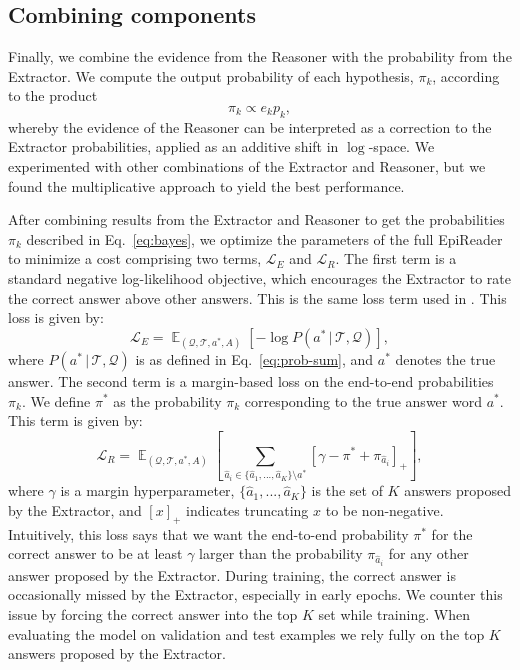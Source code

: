 \documentclass[11pt,letterpaper]{article}
\newcommand{\LL}{\mathcal{L}}
\newcommand{\QQ}{\mathcal{Q}}
\newcommand{\TT}{\mathcal{T}}
\DeclareMathOperator*{\expect}{\mathbb{E}}
\begin{document}
\subsection{Combining components}
Finally, we combine the evidence from the Reasoner with the probability from the Extractor.
We compute the output probability of each hypothesis, $\pi_k$, according to the product
\begin{equation}
	\pi_k \propto e_k p_k,
	\label{eq:bayes}
\end{equation}
whereby the evidence of the Reasoner can be interpreted as a correction to the Extractor probabilities, applied as an additive shift in $\log$-space.
We experimented with other combinations of the Extractor and Reasoner, but we found the multiplicative approach to yield the best performance. 

After combining results from the Extractor and Reasoner to get the probabilities $\pi_k$ described in Eq.~\ref{eq:bayes}, we optimize the parameters of the full EpiReader to minimize a cost comprising two terms, $\LL_{E}$ and $\LL_{R}$. The first term is a standard negative log-likelihood objective, which encourages the Extractor to rate the correct answer above other answers. This is the same loss term used in . This loss is given by:
\begin{equation}
\mathcal{L}_{E} = \expect_{(\QQ, \TT, a^{\ast}, A)}\left[ - \log P(a^{\ast} \, | \, \TT, \QQ) \right],
\label{eq:extractor_loss}
\end{equation}
where $P(a^{\ast} \, | \, \TT, \QQ)$ is as defined in Eq.~\ref{eq:prob-sum}, and $a^{\ast}$ denotes the true answer. The second term is a margin-based loss on the end-to-end probabilities $\pi_k$. We define $\pi^{\ast}$ as the probability $\pi_k$ corresponding to the true answer word $a^{\ast}$. This term is given by:
\begin{equation}
\mathcal{L}_{R} = \expect_{(\QQ, \TT, a^{\ast}, A)} \left[ \sum_{\hat{a}_i \in \{\hat{a}_1, ..., \hat{a}_K\} \setminus a^{\ast}} [\gamma - \pi^{\ast} + \pi_{\hat{a}_i}]_{+}  \right],
\label{eq:reasoner_loss}
\end{equation}
where $\gamma$ is a margin hyperparameter, $\{\hat{a}_1, ..., \hat{a}_K\}$ is the set of $K$ answers proposed by the Extractor, and $[ x ]_{+}$ indicates truncating $x$ to be non-negative. Intuitively, this loss says that we want the end-to-end probability $\pi^{\ast}$ for the correct answer to be at least $\gamma$ larger than the probability $\pi_{\hat{a}_i}$ for any other answer proposed by the Extractor. During training, the correct answer is occasionally missed by the Extractor, especially in early epochs. We counter this issue by forcing the correct answer into the top $K$ set while training. When evaluating the model on validation and test examples we rely fully on the top $K$ answers proposed by the Extractor.
\end{document}
